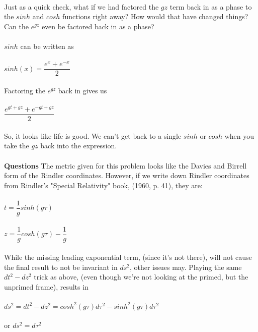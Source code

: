 \documentclass[prb,preprint]
{revtex4-1}
\begin{document}
\\
\\
\\
\\
\\
\\
Just as a quick check, what if we had factored the $gz$ term back in as a phase to the $sinh$ and $cosh$ functions right away?  How would that have changed things?  Can the $e^{gz}$ even be factored back in as a phase?
\\
\\
$sinh$ can be written as 
\\
\\
$sinh\left(x\right) = \dfrac{e^x +e^{-x}}{2}$
\\
\\
Factoring the $e^{gz}$ back in gives us
\\
\\
$\dfrac{e^{gt + gz} +e^{-gt + gz}}{2}$
\\
\\
So, it looks like life is good.  We can't get back to a single $sinh$ or $cosh$ when you take the $gz$ back into the expression.
\\
\\
\textbf{Questions}
The metric given for this problem looks like the Davies and Birrell form of the Rindler coordinates.  However, if we write down Rindler coordinates from Rindler's "Special Relativity" book, (1960, p. 41), they are:
\\
\\
$t = \dfrac{1}{g}sinh\left(g \tau\right)$
\\
\\
$z = \dfrac{1}{g}cosh\left(g \tau\right) - \dfrac{1}{g}$
\\
\\
While the missing leading exponential term, (since it's not there), will not cause the final result to not be invariant in $ds^2$, other issues may.  Playing the same $dt^2 - dz^2$ trick as above, (even though we're not looking at the primed, but the unprimed frame), results in 
\\
\\
$ds^2 = dt^2 - dz^2 = cosh^2\left(g\tau\right)d\tau^2 - sinh^2\left(g\tau\right)d\tau^2$
\\
\\
or $ds^2 = d\tau^2$
\\
\end{document}
